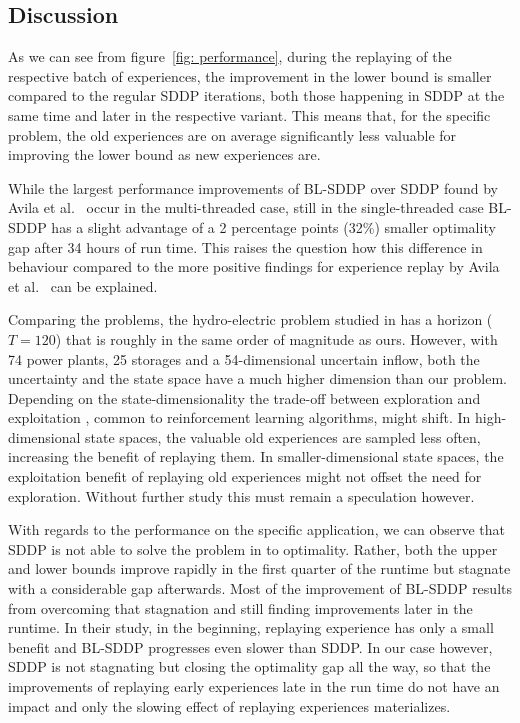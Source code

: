 \documentclass[a4paper,12pt]{article}
\begin{document}
\subsection{Discussion}
As we can see from figure~\ref{fig: performance}, during the replaying of the respective batch of experiences, the improvement in the lower bound is smaller compared to the regular SDDP iterations, both those happening in SDDP at the same time and later in the respective variant. This means that, for the specific problem, the old experiences are on average significantly less valuable for improving the lower bound as new experiences are.

While the largest performance improvements of BL-SDDP over SDDP found by Avila et al.~\cite{avila2023batch} occur in the multi-threaded case, still in the single-threaded case BL-SDDP has a slight advantage of a 2 percentage points (32\%) smaller optimality gap after 34 hours of run time.
This raises the question how this difference in behaviour compared to the more positive findings for experience replay by Avila et al.~\cite{avila2023batch} can be explained. 

Comparing the problems, the hydro-electric problem studied in \cite{avila2023batch} has a horizon ($T=120$) that is roughly in the same order of magnitude as ours. However, with 74 power plants, 25 storages and a 54-dimensional uncertain inflow, both the uncertainty and the state space have a much higher dimension than our problem.
Depending on the state-dimensionality the trade-off between exploration and exploitation \cite{sutton2018reinforcement}, common to reinforcement learning algorithms, might shift. In high-dimensional state spaces, the valuable old experiences are sampled less often, increasing the benefit of replaying them. In smaller-dimensional state spaces, the exploitation benefit of replaying old experiences might not offset the need for exploration. Without further study this must remain a speculation however.

With regards to the performance on the specific application, we can observe that SDDP is not able to solve the problem in \cite{avila2023batch} to optimality. Rather, both the upper and lower bounds improve rapidly in the first quarter of the runtime but stagnate with a considerable gap afterwards.
Most of the improvement of BL-SDDP results from overcoming that stagnation and still finding improvements later in the runtime.
In their study, in the beginning, replaying experience has only a small benefit and BL-SDDP progresses even slower than SDDP.
In our case however, SDDP is not stagnating but closing the optimality gap all the way, so that the improvements of replaying early experiences late in the run time do not have an impact and only the slowing effect of replaying experiences materializes.
\end{document}

